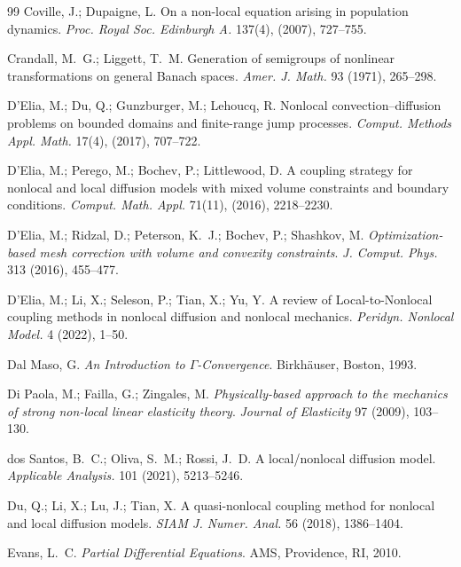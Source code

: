\documentclass[reqno]{amsart}
\numberwithin{equation}{section}
\begin{document}
\begin{thebibliography}{99}
Coville, J.; Dupaigne, L.
{On a non-local equation arising in population dynamics}.
{\it Proc. Royal Soc. Edinburgh A.} 137(4), (2007), 727--755.


Crandall, M.~G.; Liggett, T.~M.
Generation of semigroups of nonlinear transformations on general Banach spaces.
\emph{Amer. J. Math.} 93 (1971), 265--298.

D'Elia, M.; Du, Q.; Gunzburger, M.; Lehoucq, R.
Nonlocal convection--diffusion problems on bounded domains and finite-range jump processes.
\emph{Comput. Methods Appl. Math.} 17(4), (2017), 707--722.

D'Elia, M.; Perego, M.; Bochev, P.; Littlewood, D.
A coupling strategy for nonlocal and local diffusion models with mixed volume constraints and boundary conditions.
\emph{Comput. Math. Appl.} 71(11), (2016), 2218--2230.

D'Elia, M.; Ridzal, D.; Peterson, K.~J.; Bochev, P.; Shashkov, M.
\emph{Optimization-based mesh correction with volume and convexity constraints}.
\emph{J. Comput. Phys.} 313 (2016), 455--477.

D'Elia, M.; Li, X.; Seleson, P.; Tian, X.; Yu, Y.
{A review of Local-to-Nonlocal coupling methods in nonlocal diffusion and nonlocal mechanics}.
{\it Peridyn. Nonlocal Model.} 4 (2022), 1--50.

Dal Maso, G.
\emph{An Introduction to $\Gamma$-Convergence}.
Birkh\"auser, Boston, 1993.

Di Paola, M.; Failla, G.; Zingales, M.
{\it Physically-based approach to the mechanics of strong non-local linear elasticity theory}.
\emph{Journal of Elasticity} 97 (2009), 103--130.


dos Santos, B.~C.; Oliva, S.~M.; Rossi, J.~D.
A local/nonlocal diffusion model.
\emph{Applicable Analysis.} 101 (2021), 5213--5246.

Du, Q.; Li, X.; Lu, J.; Tian, X.
A quasi-nonlocal coupling method for nonlocal and local diffusion models.
\emph{SIAM J. Numer. Anal.} 56 (2018), 1386--1404.

Evans, L.~C.
\emph{Partial Differential Equations}.
AMS, Providence, RI, 2010.


\end{thebibliography}
\end{document}
